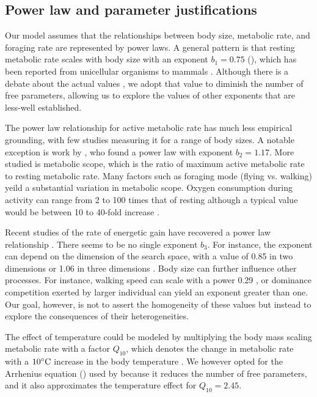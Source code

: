 \subsection*{Power law and parameter justifications}

Our model assumes that the relationships between body size, metabolic rate, and foraging rate are represented by power laws.
A general pattern is that resting metabolic rate scales with body size with an exponent $b_1 = 0.75$ (), which has been reported from unicellular organisms to mammals \citep{Kleiber1947, Peters1986,Gillooly2001,Brown2004}.
Although there is a debate about the actual values \citep[e.g.,][]{Isaac2010}, we adopt that value to diminish the number of free parameters, allowing us to explore the values of other exponents that are less-well established.

The power law relationship for active metabolic rate has much less empirical grounding, with few studies measuring it for a range of body sizes.
A notable exception is work by \citet{Bartholomew1978}, who found a power law with exponent $b_2 = 1.17$.
More studied is metabolic scope, which is the ratio of maximum active metabolic rate to resting metabolic rate.
Many factors such as foraging mode (flying vs. walking) yeild a substantial variation in metabolic scope.
Oxygen consumption during activity can range from 2 to 100 times that of resting \citep{Bartholomew1978, Bartholomew1981, Bartholomew1985, Chown2004,Niitepold2010} although a typical value would be between 10 to 40-fold increase \citep{Bartholomew1981,Nittepold2010}. %

Recent studies of the rate of energetic gain have recovered a power law relationship \citep{Pawar2012, Maino2015}.
There seems to be no single exponent $b_3$.
For instance, the exponent can depend on the dimension of the search space, with a value of 0.85 in two dimensions or 1.06 in three dimensions \citep{Pawar2012}.
Body size can further influence other processes.
For instance, walking speed  can scale with a power 0.29 \citep{Peters1986}, or dominance competition exerted by larger individual can yield an exponent greater than one.
Our goal, however, is not to assert the homogeneity of these values but instead to explore the consequences of their heterogeneities.

The effect of temperature could be modeled by multiplying the body mass scaling metabolic rate with a factor $Q_{10}$, which denotes the change in metabolic rate with a $10^ {\circ} \rm{C}$ increase in the body temperature \citep{Precht1973}.
We however opted for the Arrhenius equation () used by \citet{Brown2004} because it reduces the number of free parameters, and it also approximates the temperature effect for $Q_{10} = 2.45$.

